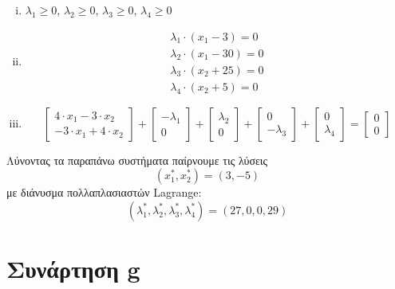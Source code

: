 \begin{enumerate}[i)]
	\item $\lambda_1 \geq 0$, $\lambda_2 \geq 0$, $\lambda_3 \geq 0$, $\lambda_4 \geq 0$
	\item \begin{align*}
			\lambda_1 \cdot (x_1 - 3) = 0\\
			\lambda_2 \cdot (x_1 - 30) = 0\\
			\lambda_3 \cdot (x_2 + 25) = 0\\
			\lambda_4 \cdot (x_2 + 5) = 0
		\end{align*}
	\item \begin{equation*}
		\begin{bmatrix}
			4 \cdot x_1 - 3 \cdot x_2\\
			-3 \cdot x_1 + 4 \cdot x_2
		\end{bmatrix} + 
		\begin{bmatrix}
			-\lambda_1\\
			0
		\end{bmatrix} +
		\begin{bmatrix}
			\lambda_2\\
			0
		\end{bmatrix} +
		\begin{bmatrix}
			0\\
			-\lambda_3
		\end{bmatrix} +		
		\begin{bmatrix}
			0\\
			\lambda_4
		\end{bmatrix} = 
		\begin{bmatrix}
			0\\
			0
		\end{bmatrix}
	\end{equation*}
\end{enumerate}
Λύνοντας τα παραπάνω συστήματα παίρνουμε τις λύσεις
\begin{equation}
	(x_1^*, x_2^*) = (3, -5)
\end{equation}
με διάνυσμα πολλαπλασιαστών Lagrange:
\begin{equation*}
	(\lambda_1^*, \lambda_2^*, \lambda_3^*, \lambda_4^*) = (27, 0, 0, 29)
\end{equation*}

\newpage
\section{Συνάρτηση g}

